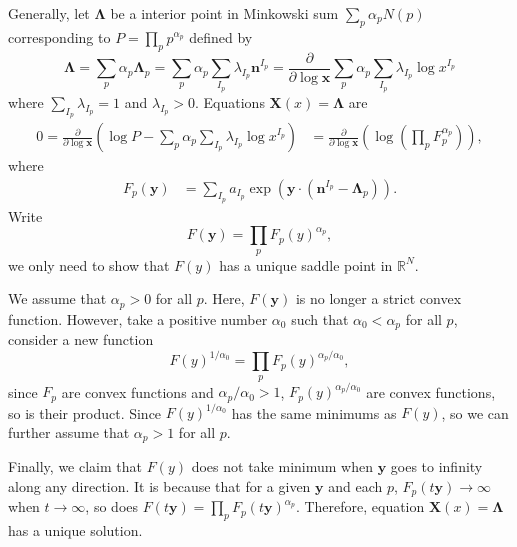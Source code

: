 \documentclass[12pt]{article}
\theoremstyle{definition}
\theoremstyle{plain}
\begin{document}
Generally, let $\mathbf{\Lambda}$ be a interior point in Minkowski sum $\sum_p \alpha_p N(p)$ corresponding to $P=\prod_p p^{\alpha_p}$ defined by 
\[
	\mathbf{\Lambda}
	=\sum_p \alpha_p \mathbf{\Lambda}_p
	=\sum_p \alpha_p \sum_{I_p}\lambda_{I_p}\mathbf{n}^{I_p}
	=\frac{\partial}{\partial \log \mathbf{x}}\sum_{p}\alpha_p\sum_{I_p}\lambda_{I_p} \log x^{I_p}
\]
where $\sum_{I_p} \lambda_{I_p}=1$ and $\lambda_{I_p} > 0$. Equations $\mathbf{X}(x)=\mathbf{\Lambda}$ are 
\[
\begin{aligned}
	0=\frac{\partial }{\partial \log \mathbf{x}}\left(
	\log P-\sum_{p}\alpha_p\sum_{I_p}\lambda_{I_p} \log x^{I_p}
	\right)&=\frac{\partial }{\partial \log \mathbf{x}}\left(
	\log \left(\prod_p F_p^{\alpha_p}\right)
	\right),
\end{aligned}
\]
where
\[
	\begin{aligned}
		F_p(\mathbf y)&=\sum_{I_p} a_{I_p} \exp\left(\mathbf{y}\cdot \left(\mathbf{n}^{I_p}-\mathbf{\Lambda}_p\right)\right).
	\end{aligned}
\]
Write
\[
	F(\mathbf y)=\prod_p F_p(y)^{\alpha_p},
\]
we only need to show that $F(y)$ has a unique saddle point in $\mathbb R^N$.

We assume that $\alpha_p>0$ for all $p$. Here, $F(\mathbf y)$ is no longer a strict convex function. However, take a positive number $\alpha_0$ such that $\alpha_0< \alpha_p$ for all $p$, consider a new function
\[
	F(y)^{1/\alpha_0}=\prod_p F_p(y)^{\alpha_p/\alpha_0},
\]
since $F_p$ are convex functions and $\alpha_p/\alpha_0>1$, $F_p(y)^{\alpha_p/\alpha_0}$ are convex functions, so is their product. Since $F(y)^{1/\alpha_0}$ has the same minimums as $F(y)$, so we can further assume that $\alpha_p>1$ for all $p$.

Finally, we claim that $F(y)$ does not take minimum when $\mathbf{y}$ goes to infinity along any direction. It is because that for a given $\mathbf{y}$ and each $p$, $F_p(t\mathbf{y})\to \infty$ when $t\to \infty$, so does $F(t\mathbf{y})=\prod_p F_p(t\mathbf{y})^{\alpha_p}$. Therefore, equation $\mathbf{X}(x)=\mathbf{\Lambda}$ has a unique solution.


\end{document}
